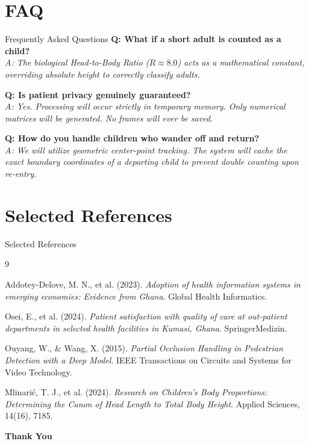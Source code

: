 \documentclass[11pt, aspectratio=169]{beamer}
\begin{document}
\section{FAQ}
\begin{frame}{Frequently Asked Questions}
    \textbf{Q: What if a short adult is counted as a child?} \\
    \textit{A: The biological Head-to-Body Ratio ($R \approx 8.0$) acts as a mathematical constant, overriding absolute height to correctly classify adults.}
    
    \vspace{0.4cm}
    \textbf{Q: Is patient privacy genuinely guaranteed?} \\
    \textit{A: Yes. Processing will occur strictly in temporary memory. Only numerical matrices will be generated. No frames will ever be saved.}
    
    \vspace{0.4cm}
    \textbf{Q: How do you handle children who wander off and return?} \\
    \textit{A: We will utilize geometric center-point tracking. The system will cache the exact boundary coordinates of a departing child to prevent double counting upon re-entry.}
\end{frame}

\section{Selected References}
\begin{frame}{Selected References}
    \begin{thebibliography}{9}
        
         Addotey-Delove, M. N., et al. (2023). \textit{Adoption of health information systems in emerging economies: Evidence from Ghana}. Global Health Informatics.
        
         Osei, E., et al. (2024). \textit{Patient satisfaction with quality of care at out-patient departments in selected health facilities in Kumasi, Ghana}. SpringerMedizin.
        
         Ouyang, W., \& Wang, X. (2015). \textit{Partial Occlusion Handling in Pedestrian Detection with a Deep Model}. IEEE Transactions on Circuits and Systems for Video Technology.
        
         Mlinarić, T. J., et al. (2024). \textit{Research on Children's Body Proportions: Determining the Canon of Head Length to Total Body Height}. Applied Sciences, 14(16), 7185.
        
    \end{thebibliography}
\end{frame}

\begin{frame}
    \begin{center}
        \Huge \textbf{Thank You}
    \end{center}
\end{frame}
\end{document}
